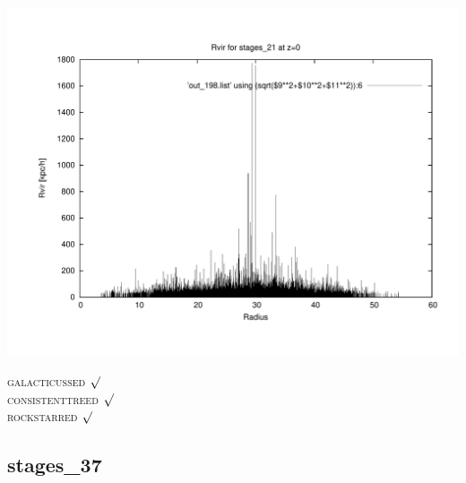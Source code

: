 \includegraphics[scale=0.3]{stages_21/plot_rvir_z0.pdf}

\textsc{galacticussed} $\surd$ \\
\textsc{consistenttreed} $\surd$ \\ 
\textsc{rockstarred} $\surd$

% 
%
%
%
%
%
%
%


\newpage
\subsection{stages\_37}

% 
% 

